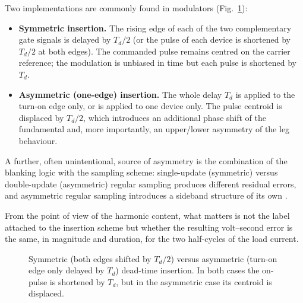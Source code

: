 \documentclass[11pt,a4paper]{article}
\begin{document}
Two implementations are commonly found in modulators (Fig.~\ref{fig:timing}):

\begin{itemize}
\item \textbf{Symmetric insertion.} The rising edge of each of the two complementary gate
signals is delayed by $T_d/2$ (or the pulse of each device is shortened by $T_d/2$ at both
edges). The commanded pulse remains centred on the carrier reference; the modulation is
unbiased in time but each pulse is shortened by $T_d$.
\item \textbf{Asymmetric (one-edge) insertion.} The whole delay $T_d$ is applied to the
turn-on edge only, or is applied to one device only. The pulse centroid is displaced by
$T_d/2$, which introduces an additional phase shift of the fundamental and, more
importantly, an upper/lower asymmetry of the leg behaviour.
\end{itemize}

A further, often unintentional, source of asymmetry is the combination of the blanking
logic with the sampling scheme: single-update (symmetric) versus double-update
(asymmetric) regular sampling produces different residual errors, and asymmetric regular
sampling introduces a sideband structure of its own \cite{holmes2003,oliveira2007}.

From the point of view of the harmonic content, what matters is not the label attached to
the insertion scheme but whether the resulting volt--second error is the same, in
magnitude and duration, for the two half-cycles of the load current.

\begin{figure}[htb]
\centering
{}
\caption{Symmetric (both edges shifted by $T_d/2$) versus asymmetric (turn-on edge only
delayed by $T_d$) dead-time insertion. In both cases the on-pulse is shortened by $T_d$,
but in the asymmetric case its centroid is displaced.}
\label{fig:timing}
\end{figure}
\end{document}
